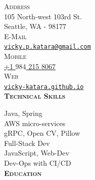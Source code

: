 \documentclass[letterpaper,12pt,final]{memoir}
\newcommand{\SmallSep}{\vspace{0.5em}}
\newcommand{\CVSection}[1]
	{\Large\textbf{\textsc{{#1}}}\par
	\SmallSep\normalsize\normalfont}
\newcommand{\CVItemSC}[1]
{{\textsc{\color{Plum} #1}}}
\begin{document}

\begin{flushright} 
	\footnotesize
	\SmallSep
	\CVItemSC{Address}\\%
	
	105 North-west 103rd St.\\
	Seattle, WA - 98177\\
	\SmallSep
	\CVItemSC{E-Mail}\\%
	\href{mailto:vicky.p.katara@gmail.com}{\texttt{vicky.p.katara@gmail.com}}\\
	\SmallSep
	\CVItemSC{Mobile}\\%
	\href{tel:+19842158067}{+1 \(984\) 215 8067}\\
	\SmallSep
	\SmallSep
	\CVItemSC{Web}\\%
	\href{https://vicky-katara.github.io/}{\texttt{vicky-katara.github.io}}\\
	\SmallSep
\CVSection{Technical Skills}
{\footnotesize Java, Spring}\\
{\footnotesize AWS micro-services}\\
{\footnotesize gRPC, Open CV, Pillow}\\
{\footnotesize Full-Stack Dev}\\
{\footnotesize JavaScript, Web-Dev}\\
{\footnotesize Dev-Ops with CI/CD}\\
\SmallSep
\SmallSep
\CVSection{Education}



\end{flushright}
\end{document}
